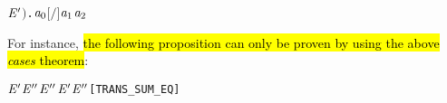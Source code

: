 \begin{itemize}
\begin{alltt}
             \HOLTokenTransBegin{}\HOLTokenTransEnd \ensuremath{\HOLBoundVar{E}\sp{\prime}}\ensuremath{)} \HOLSymConst{\HOLTokenDisj{}} \HOLSymConst{\HOLTokenExists{}} . \ensuremath{\HOLBoundVar{a}\sb{\mathrm{0}}} \HOLSymConst{\ensuremath{=}}    \HOLSymConst{\HOLTokenConj{}} \ensuremath{[}  \ensuremath{/}\ensuremath{]}  \HOLTokenTransBegin\ensuremath{\HOLBoundVar{a}\sb{\mathrm{1}}}\HOLTokenTransEnd \ensuremath{\HOLBoundVar{a}\sb{\mathrm{2}}}    
\end{alltt}  
For instance, \hl{the following proposition
can only be proven by using the above \emph{cases} theorem}:
\begin{alltt}
\HOLTokenTurnstile{}  \HOLSymConst{\ensuremath{+}} \ensuremath{\HOLFreeVar{E}\sp{\prime}} \HOLTokenTransBegin{}\HOLTokenTransEnd \ensuremath{\HOLFreeVar{E}\sp{\prime\prime}} \HOLSymConst{\HOLTokenEquiv{}}  \HOLTokenTransBegin{}\HOLTokenTransEnd \ensuremath{\HOLFreeVar{E}\sp{\prime\prime}} \HOLSymConst{\HOLTokenDisj{}} \ensuremath{\HOLFreeVar{E}\sp{\prime}} \HOLTokenTransBegin{}\HOLTokenTransEnd \ensuremath{\HOLFreeVar{E}\sp{\prime\prime}}\hfill{[TRANS_SUM_EQ]}
\end{alltt}
\end{itemize}

